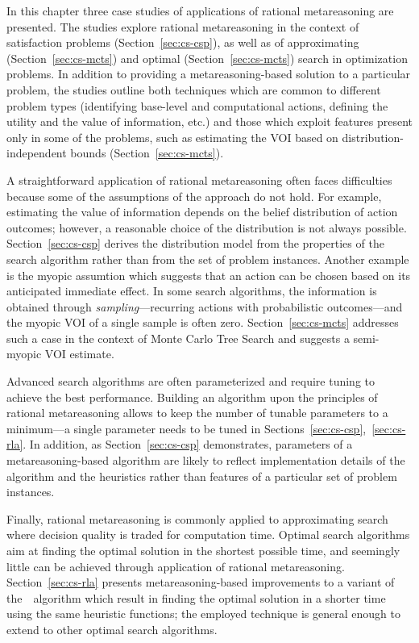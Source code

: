 In this chapter three case studies of applications of rational
metareasoning are presented. The studies explore rational
metareasoning in the context of satisfaction problems
(Section~\ref{sec:cs-csp}), as well as of approximating
(Section~\ref{sec:cs-mcts}) and optimal (Section~\ref{sec:cs-mcts})
search in optimization problems. In addition to providing a
metareasoning-based solution to a particular problem, the studies
outline both techniques which are common to different problem types
(identifying base-level and computational actions, 
defining the utility and the value of information, etc.)
and those which exploit features present only in some of the problems,
such as estimating the VOI based on distribution-independent bounds
(Section~\ref{sec:cs-mcts}). 

A straightforward application of rational metareasoning often faces
difficulties because some of the assumptions of the approach do not
hold. For example, estimating the value of information depends on
the belief distribution of action outcomes; however, a reasonable choice
of the distribution is not always possible. Section~\ref{sec:cs-csp}
derives the distribution model from the properties of the search
algorithm rather than from the set of problem instances. Another
example is the myopic assumtion \cite{Russell.right} which suggests
that an action can be chosen based on its anticipated immediate
effect. In some search algorithms, the information is obtained through
\emph{sampling}---recurring actions with probabilistic outcomes---and
the myopic VOI of a single sample is often
zero. Section~\ref{sec:cs-mcts} addresses such a case in the context
of Monte Carlo Tree Search and suggests a semi-myopic VOI estimate.

Advanced search algorithms are often parameterized and require tuning
to achieve the best performance. Building an algorithm upon the
principles of rational metareasoning allows to keep the number of
tunable parameters to a minimum---a single parameter needs to be tuned
in Sections~\ref{sec:cs-csp},~\ref{sec:cs-rla}. In addition, as
Section~\ref{sec:cs-csp} demonstrates, parameters
of a metareasoning-based algorithm are likely to reflect
implementation details of the algorithm and the heuristics rather
than features of a particular set of problem instances.

Finally, rational metareasoning is commonly applied to approximating
search where decision quality is traded for computation time. Optimal
search algorithms aim at finding the optimal solution in the shortest
possible time, and seemingly little can be achieved through
application of rational metareasoning.  Section~\ref{sec:cs-rla}
presents metareasoning-based improvements to a variant of
the~\astar~algorithm which result in finding the optimal solution in a
shorter time using the same heuristic functions; the employed
technique is general enough to extend to other optimal
search algorithms.


